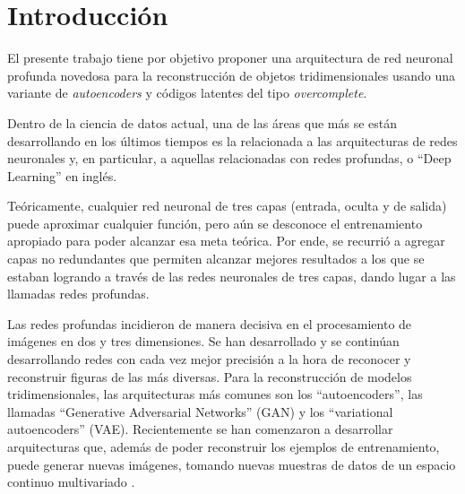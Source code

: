 \documentclass[spanish]{article}
\begin{document}




\section{Introducción}

El presente trabajo tiene por objetivo proponer una arquitectura de red
neuronal profunda novedosa para la reconstrucción de objetos
tridimensionales usando una variante de \textit{autoencoders} y códigos
latentes del tipo \textit{overcomplete}.

Dentro de la ciencia de datos actual, una de las áreas que más se
están desarrollando en los últimos tiempos es la relacionada a las
arquitecturas de redes neuronales y, en particular, a aquellas relacionadas
con redes profundas, o ``Deep Learning'' en inglés.

Teóricamente, cualquier red neuronal de tres capas (entrada, oculta
y de salida) puede aproximar cualquier función, pero aún se desconoce
el entrenamiento apropiado para poder alcanzar esa meta teórica.
Por ende, se recurrió a agregar capas no redundantes que permiten
alcanzar mejores resultados a los que se estaban logrando a través
de las redes neuronales de tres capas, dando lugar a las llamadas
redes profundas.

Las redes profundas incidieron de manera decisiva en el procesamiento
de imágenes en dos y tres dimensiones. Se han desarrollado y se continúan
desarrollando redes con cada vez mejor precisión a la hora de reconocer
y reconstruir figuras de las más diversas. Para la reconstrucción
de modelos tridimensionales, las arquitecturas más comunes son los ``autoencoders'',
las llamadas ``Generative Adversarial Networks'' (GAN) y los ``variational
autoencoders'' (VAE). Recientemente se han comenzaron a desarrollar
arquitecturas que, además de poder reconstruir los ejemplos de entrenamiento,
puede generar nuevas imágenes, tomando nuevas muestras de datos de
un espacio continuo multivariado \cite{Karras2018}.
\end{document}
